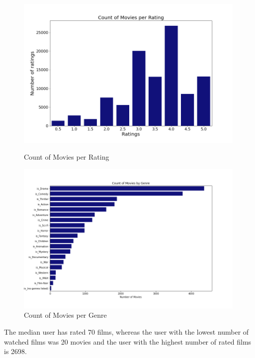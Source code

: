 \documentclass[12pt]{article}
\numberwithin{equation}{section}
\begin{document}
\begin{figure}[h!]
    \begin{minipage}[b]{0.49\linewidth}
         \centering
  	\includegraphics[width=0.99\textwidth]{count_rating.png}
  	\caption{Count of Movies per Rating}
  	\label{fig:count_ranking}
    \end{minipage}
    \hspace{0.01cm}
    \begin{minipage}[b]{0.49\linewidth}
        \centering
  	\includegraphics[width=0.99\textwidth]{count_genre.png}
  	\caption{Count of Movies per Genre}
  	\label{fig:count_genre}
    \end{minipage}
\end{figure}

The median user has rated 70 films, whereas the user with the lowest number of watched films was 20 movies and the user with the highest number of rated films is 2698.
\end{document}
